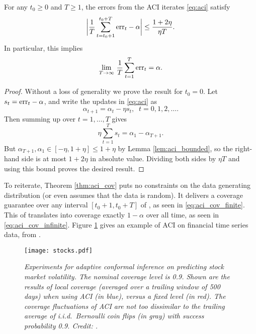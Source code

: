 \documentclass{article}
\begin{document}
\begin{theorem}
\label{thm:aci_cov}
For any $t_0 \geq 0$ and $T \geq 1$, the errors from the ACI iterates
\eqref{eq:aci} satisfy     
\begin{equation}
\label{eq:aci_cov_finite}
\bigg| \frac{1}{T} \sum_{t=t_0+1}^{t_0+T} \mathrm{err}_t - \alpha \bigg| \leq \frac{1 +
  2\eta}{\eta T}. 
\end{equation}
In particular, this implies
\begin{equation}
\label{eq:aci_cov_infinite}
\lim_{T \to \infty} \, \frac{1}{T} \sum_{t=1}^T \mathrm{err}_t = \alpha. 
\end{equation}
\end{theorem}

\begin{proof}
Without a loss of generality we prove the result for $t_0=0$. Let $s_t = \mathrm{err}_t
- \alpha$, and write the updates in \eqref{eq:aci} as 
\[
\alpha_{t+1} = \alpha_t - \eta s_t, \;\; t=0,1,2,\ldots.
\] 
Then summing up over $t = 1,\dots,T$ gives
\[
\eta \sum_{t=1}^T s_t = \alpha_1 - \alpha_{T+1}.
\]
But $\alpha_{T+1}, \alpha_1 \in [-\eta, 1+\eta]\leq 1+\eta$ by Lemma
\ref{lem:aci_bounded}, so the right-hand side is at most $1 + 2\eta$ in absolute 
value. Dividing both sides by $\eta T$ and using this bound proves the desired
result.  
\end{proof}

To reiterate, Theorem \ref{thm:aci_cov} puts no constraints on the data
generating distribution (or even assumes that the data is random). It delivers a
coverage guarantee over any interval $[t_0+1, t_0+T]$ of , as seen in \eqref{eq:aci_cov_finite}. This of
translates into coverage exactly $1-\alpha$ over all time, as seen in
\eqref{eq:aci_cov_infinite}. Figure \ref{fig:stocks} gives an example of ACI on
financial time series data, from \citet{gibbs2021adaptive}.  

\begin{figure}[htb]
\texttt{[image: stocks.pdf]}
\caption{\it Experiments for adaptive conformal inference on predicting stock
  market volatility. The nominal coverage level is 0.9. Shown are the results of
  local coverage (averaged over a trailing window of 500 days) when using ACI
  (in blue), versus a fixed level (in red). The coverage fluctuations of ACI are
  not too dissimilar to the trailing average of i.i.d.\ Bernoulli coin flips (in
  gray) with success probability 0.9. Credit: \citet{gibbs2021adaptive}.}           
\label{fig:stocks}
\end{figure}
\end{document}
